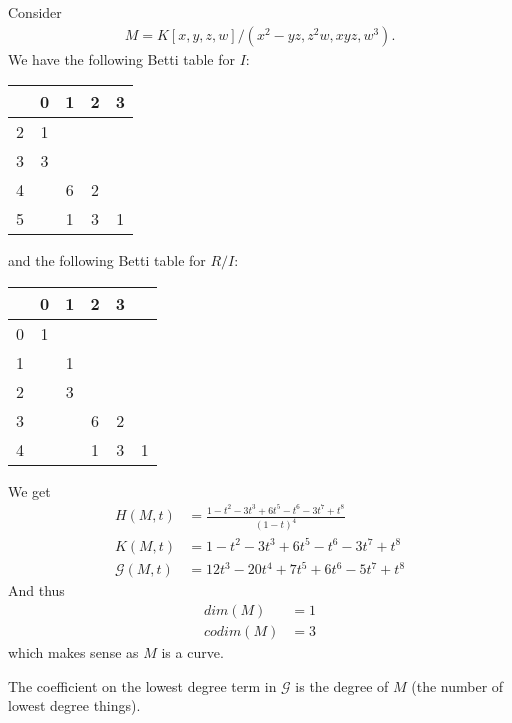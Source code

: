 \begin{example} Consider
    \begin{align*}
        M = K [x,y,z,w]/ ( x^2 - yz , z^2 w , xyz, w^3).
    \end{align*}
    We have the following Betti table for $I$:

    \begin{center}
    \begin{tabular}{ c | c c c c }
      & 0 & 1 & 2 & 3 \\
    \hline
    2 & 1 &   &   &   \\
    3 & 3 &   &   &   \\
    4 &   & 6 & 2 &   \\
    5 &   & 1 & 3 & 1 \\
    \end{tabular}
    \end{center}

    and the following Betti table for $R/I$:

    \begin{center}
    \begin{tabular}{ c | c c c c c }
      & 0 & 1 & 2 & 3 \\
    \hline
    0 & 1 &   &   &   &   \\
    1 &   & 1 &   &   &   \\
    2 &   & 3 &   &   &   \\
    3 &   &   & 6 & 2 &   \\
    4 &   &   & 1 & 3 & 1 \\
    \end{tabular}
    \end{center}

    We get
    \begin{align*}
        H(M,t) &= \frac{1 - t^2 - 3t^3 + 6t^5 - t^6 -3t^7 + t^8 }{(1-t)^4}\\
        K(M,t) &= 1 - t^2 - 3t^3 + 6t^5 - t^6 -3t^7 + t^8\\
        \mathscr{G}(M,t) &= 12t^3 -20t^4 + 7t^5 + 6t^6 -5t^7 + t^8
    \end{align*}
    And thus
    \begin{align*}
        dim(M) &= 1\\
        codim(M) &= 3
    \end{align*}
    which makes sense as $M $ is a curve.
\end{example}

\begin{definition}
    The coefficient on the lowest degree term in $\mathscr{G}$ is the degree of $M$ (the number of lowest degree things).
\end{definition}

